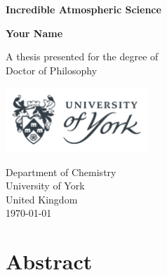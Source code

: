 



 
\begin{titlepage}
    \begin{center}
       \vspace*{1cm}

       \huge \textbf{Incredible Atmospheric Science}%

       \vspace{2cm}

       \Large \textbf{Your Name}%

       \vfill
       \large
       A thesis presented for the degree of\\
       Doctor of Philosophy
            
       \vspace{0.8cm}
     
       \includegraphics[width=0.4\textwidth]{graphics/uoy_logo.png}
       \normalsize
       
       Department of Chemistry\\
       University of York\\
       United Kingdom\\
       \monthyeardate\today
            
   \end{center}
\end{titlepage}

\newpage

\pagestyle{plain}

\section{Abstract}

